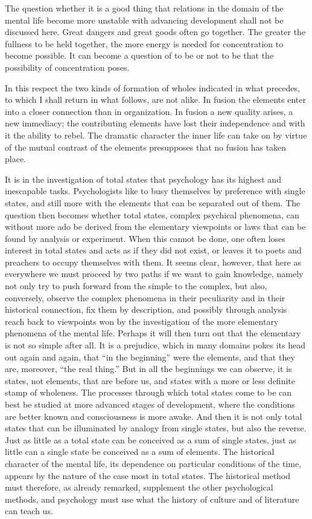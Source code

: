 \documentclass[12pt]{book}
\newcommand{\opage}[1]{\marginnote{\footnotesize\textit{[#1]}}}
\begin{document}
The question whether it is a good thing that relations in the domain of the
mental life become more unstable with advancing development shall not be
discussed here. Great dangers and great goods often go together. The greater the
fullness to be held together, the more energy is needed for concentration to
become possible. It can become a question of to be or not to be that the
possibility of concentration poses.

In this respect the two kinds of formation of wholes indicated in what precedes,
to which I shall return in what follows, are not alike. In fusion the elements
enter into a closer connection than in organization. In fusion a new quality
arises, a new immediacy; the contributing elements have lost their independence
and with it the ability to rebel. The dramatic character the inner life can take
on by virtue of the mutual contrast of the elements presupposes that no fusion
has taken place.

\opage{24}It is in the investigation of total states that psychology has its
highest and inescapable tasks. Psychologists like to busy themselves by
preference with single states, and still more with the elements that can be
separated out of them. The question then becomes whether total states, complex
psychical phenomena, can without more ado be derived from the elementary
viewpoints or laws that can be found by analysis or experiment. When this cannot
be done, one often loses interest in total states and acts as if they did not
exist, or leaves it to poets and preachers to occupy themselves with them. It
seems clear, however, that here as everywhere we must proceed by two paths if we
want to gain knowledge, namely not only try to push forward from the simple to
the complex, but also, conversely, observe the complex phenomena
in their peculiarity and in their historical connection, fix them by
description, and possibly through analysis reach back to viewpoints won by the
investigation of the more elementary phenomena of the mental life. Perhaps it
will then turn out that the elementary is not so simple after all. It is a
prejudice, which in many domains pokes its head out again and again, that ``in
the beginning'' were the elements, and that they are, moreover, ``the real
thing.'' But in all the beginnings we can observe, it is states, not elements,
that are before us, and states with a more or less definite stamp of wholeness.
The processes through which total states come to be can best be studied at more
advanced stages of development, where the conditions are better known and
consciousness is more awake. And then it is not only total states that can be
illuminated by analogy from single states, but also the reverse. Just as little
as a total state can be conceived as a sum of single states, just as little can a
single state be conceived as a sum of elements. The historical character of the
mental life, its dependence on particular conditions of the time, appears by the
nature of the case most in total states. The historical method must therefore, as
already remarked, supplement the other psychological methods, and psychology
must use what the history of culture and of literature can teach us.
\end{document}
